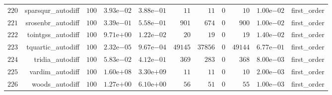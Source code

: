 \documentclass[varwidth=20cm,crop=true]{standalone}
\begin{document}
\begin{longtable}{rrrrrrrrrrr}
  \(   220\) & sparsqur\_autodiff & \(   100\) & \( 3.93\)e\(-02\) & \( 3.88\)e\(-01\) & \(    11\) & \(    11\) & \(     0\) & \(    10\) & \( 1.00\)e\(-02\) & first\_order \\
  \(   221\) & srosenbr\_autodiff & \(   100\) & \( 3.39\)e\(-01\) & \( 5.58\)e\(-01\) & \(   901\) & \(   674\) & \(     0\) & \(   900\) & \( 1.00\)e\(-02\) & first\_order \\
  \(   222\) & tointgss\_autodiff & \(   100\) & \( 9.71\)e\(+00\) & \( 1.22\)e\(-02\) & \(    20\) & \(    19\) & \(     0\) & \(    19\) & \( 1.40\)e\(-02\) & first\_order \\
  \(   223\) & tquartic\_autodiff & \(   100\) & \( 2.32\)e\(-05\) & \( 9.67\)e\(-04\) & \( 49145\) & \( 37856\) & \(     0\) & \( 49144\) & \( 6.77\)e\(-01\) & first\_order \\
  \(   224\) & tridia\_autodiff & \(   100\) & \( 5.83\)e\(-02\) & \( 4.12\)e\(-01\) & \(   369\) & \(   283\) & \(     0\) & \(   368\) & \( 8.00\)e\(-03\) & first\_order \\
  \(   225\) & vardim\_autodiff & \(   100\) & \( 1.60\)e\(+08\) & \( 3.30\)e\(+09\) & \(    11\) & \(    11\) & \(     0\) & \(    10\) & \( 2.00\)e\(-03\) & first\_order \\
  \(   226\) & woods\_autodiff & \(   100\) & \( 1.27\)e\(+00\) & \( 6.10\)e\(+00\) & \(    56\) & \(    51\) & \(     0\) & \(    55\) & \( 1.00\)e\(-03\) & first\_order \\\hline
\end{longtable}
\end{document}
